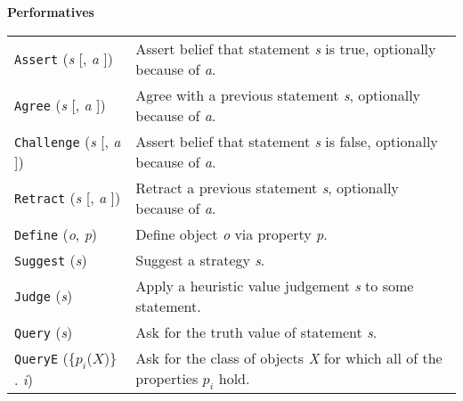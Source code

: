 \begin{table}[ht]
\begin{mdframed}
{\centering
\textbf{Performatives}

\par}

\smallskip

\begin{tabular}{@{\hspace{-.25ex}}p{}p{}}
\texttt{Assert} (\emph{s} [, \emph{a} ]) & Assert belief that statement \emph{s} is true, optionally because of \emph{a}.\\
\texttt{Agree} (\emph{s} [, \emph{a} ]) & Agree with a previous statement \emph{s}, optionally because of \emph{a}.\\
\texttt{Challenge} (\emph{s} [, \emph{a} ]) & Assert belief that statement \emph{s} is false, optionally because of \emph{a}.\\
\texttt{Retract} (\emph{s} [, \emph{a} ]) & Retract a previous statement \emph{s}, optionally because of \emph{a}.\\
\texttt{Define} (\emph{o}, \emph{p}) & Define object \emph{o} via property \emph{p}.\\
\texttt{Suggest} (\emph{s}) & Suggest a strategy \emph{s}.\\
\texttt{Judge} (\emph{s}) & Apply a heuristic value judgement \emph{s} to some statement.\\
\texttt{Query} (\emph{s}) & Ask for the truth value of statement \emph{s}.\\
\texttt{QueryE} (\{$p_i$($X$)\} . \emph{i}) & Ask for the class of objects \emph{X} for which all of the properties $p_i$ hold.
\end{tabular}






\end{mdframed}
\end{table}
